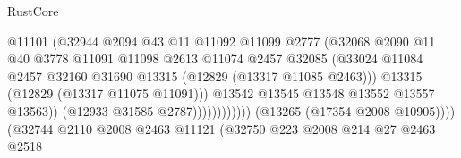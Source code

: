 \begin{lexlean}{RustCore}
\begin{coremodule}
                                                  @11101
                                                  (@32944
                                                    @2094
                                                    @43
                                                    @11
                                                    @11092
                                                    @11099
                                                    @2777
                                                    (@32068
                                                      @2090
                                                      @11
                                                      @40
                                                      @3778
                                                      @11091
                                                      @11098
                                                      @2613
                                                      @11074
                                                      @2457
                                                      @32085
                                                      (@33024
                                                        @11084
                                                        @2457
                                                        @32160
                                                        @31690
                                                        @13315
                                                        (@12829 (@13317 @11085 @2463)))
                                                      @13315
                                                      (@12829 (@13317 @11075 @11091)))
                                                    @13542
                                                    @13545
                                                    @13548
                                                    @13552
                                                    @13557
                                                    @13563))
                                                (@12933 @31585 @2787))))))))))))
                          (@13265 (@17354 @2008 @10905))))
                      (@32744
                        @2110
                        @2008
                        @2463
                        @11121
                        (@32750
                          @223
                          @2008
                          @214
                          @27
                          @2463
                          @2518

\end{coremodule}
\end{lexlean}
